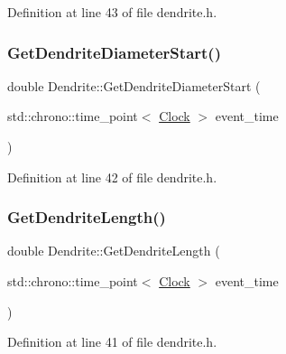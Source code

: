 Definition at line 43 of file dendrite.\+h.

\mbox{\label{class_dendrite_aa103a34ce3d3525b350cb02c0a7855ea}} 
\subsubsection{\texorpdfstring{Get\+Dendrite\+Diameter\+Start()}{GetDendriteDiameterStart()}}
{\footnotesize\ttfamily double Dendrite\+::\+Get\+Dendrite\+Diameter\+Start (\begin{DoxyParamCaption}\item[{std\+::chrono\+::time\+\_\+point$<$ \hyperlink{universe_8h_a0ef8d951d1ca5ab3cfaf7ab4c7a6fd80}{Clock} $>$}]{event\+\_\+time }\end{DoxyParamCaption})\hspace{0.3cm}{\ttfamily [inline]}}



Definition at line 42 of file dendrite.\+h.

\mbox{\label{class_dendrite_a64ebf49c488bb0225e1e5c8a8d9935d9}} 
\subsubsection{\texorpdfstring{Get\+Dendrite\+Length()}{GetDendriteLength()}}
{\footnotesize\ttfamily double Dendrite\+::\+Get\+Dendrite\+Length (\begin{DoxyParamCaption}\item[{std\+::chrono\+::time\+\_\+point$<$ \hyperlink{universe_8h_a0ef8d951d1ca5ab3cfaf7ab4c7a6fd80}{Clock} $>$}]{event\+\_\+time }\end{DoxyParamCaption})\hspace{0.3cm}{\ttfamily [inline]}}



Definition at line 41 of file dendrite.\+h.

\mbox{\label{class_dendrite_a1aa1fd51aab3996cf1a9b0ff6a86647c}} 
